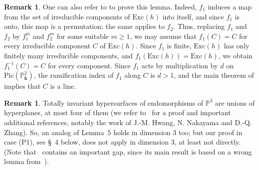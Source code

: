 \documentclass[reqno,oneside,12pt]{amsart}
\theoremstyle{plain}
\theoremstyle{definition}
\newtheorem{rem}[thm]{Remark}
\def\bfk{{\mathbf{k}}}
\newcommand{\bbA}{{\mathbb{A}}}
\newcommand{\Spec}{{\mathrm{Spec}}}
\def\P{\mathbb{P}}
\def\Pic{{\mathrm{Pic}}}
\def\Exc{{\text{Exc}}}
\begin{document}
\begin{rem}
One can also refer to \cite{Gurjar2003} to prove this lemma. Indeed,  
$f_1$ induces a map from the set of irreducible components of $\Exc(h)$ into itself, 
and since $f_1$ is onto, this map is a permutation; the same applies to $f_2$. Thus,
replacing $f_1$ and $f_2$ by $f_1^m$ and $f_2^m$ for some suitable $m\geq 1$, we may assume that $f_1(C)=C$ for every irreducible component $C$ of $\Exc(h)$.
Since $f_1$ is finite, $\Exc(h)$ has only finitely many irreducible components, and $f_1(\Exc(h))=\Exc(h)$, we obtain $f_1^{-1}(C)=C$ for every component. Since $f_1$ acts by multiplication by $d$ on $\Pic(\P^2_\bfk)$, the ramification index of $f_1$ along $C$ is $d>1$, and
the main theorem of \cite{Gurjar2003} implies that $C$ is a line. 
\end{rem}

\begin{rem}
Totally invariant hypersurfaces of endomorphisms of $\P^3$  are unions of hyperplanes, at most four of them (we refer to~\cite{Horing:2017} for a proof and important additional 
references, notably the work of J.-M. Hwang, N. Nakayama and D.-Q. Zhang). So, an analog of Lemma~5 holds
in dimension $3$ too; but our proof in case (P1), see \S~4 below, does not apply in dimension $3$, at least not directly.
(Note that~\cite{Briend-Cantat-Shishikura:2004} contains an important gap, 
since its main result is based on a wrong lemma from~\cite{Briend-Duval:2001}).
\end{rem}
\end{document}
